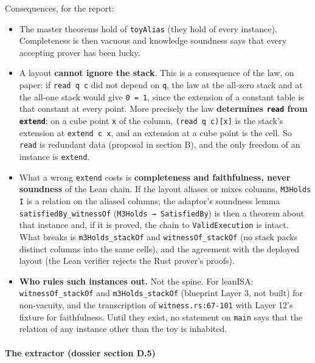 Consequences, for the report:

\begin{itemize}
\item The master theorems hold of \texttt{toyAlias} (they hold of every instance). Completeness is then vacuous and knowledge soundness says that every accepting prover has been lucky.
\item A layout \textbf{cannot ignore the stack}. This is a consequence of the law, on paper: if \texttt{read q c} did not depend on \texttt{q}, the law at the all-zero stack and at the all-one stack would give \texttt{0 = 1}, since the extension of a constant table is that constant at every point. More precisely the law \textbf{determines \texttt{read} from \texttt{extend}}: on a cube point \texttt{x} of the column, \texttt{(\allowbreak{}read q c)[x]} is the stack's extension at \texttt{extend c x}, and an extension at a cube point is the cell. So \texttt{read} is redundant data (proposal in section B), and the only freedom of an instance is \texttt{extend}.
\item What a wrong \texttt{extend} costs is \textbf{completeness and faithfulness, never soundness} of the Lean chain. If the layout aliases or mixes columns, \texttt{M3Holds I} is a relation on the aliased columns; the adaptor's soundness lemma \texttt{satisfiedBy\_\allowbreak{}witnessOf} (\texttt{M3Holds → SatisfiedBy}) is then a theorem about that instance and, if it is proved, the chain to \texttt{ValidExecution} is intact. What breaks is \texttt{m3Holds\_\allowbreak{}stackOf} and \texttt{witnessOf\_\allowbreak{}stackOf} (no stack packs distinct columns into the same cells), and the agreement with the deployed layout (the Lean verifier rejects the Rust prover's proofs).
\item \textbf{Who rules such instances out.} Not the spine. For leanISA: \texttt{witnessOf\_\allowbreak{}stackOf} and \texttt{m3Holds\_\allowbreak{}stackOf} (blueprint Layer 3, not built) for non-vacuity, and the transcription of \texttt{witness.\allowbreak{}rs:67-{}101} with Layer 12's fixture for faithfulness. Until they exist, no statement on \texttt{main} says that the relation of any instance other than the toy is inhabited.
\end{itemize}

\paragraph{The extractor (dossier section D.5)}\label{sec:gen-spine-D5}

